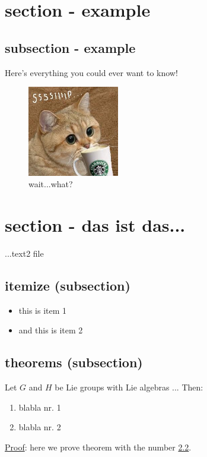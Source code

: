 
\section{section - example} 
		
\subsection{subsection - example}
Here's everything you could ever want to know!

\begin{figure}[h] %
\centering
\includegraphics[width=4cm]{./images/cat_sip.jpg}
\caption{wait...what?}
\end{figure}

\section{section - das ist das...}
...text2 file

\subsection{itemize (subsection)}

	\begin{itemize}
		\item this is item 1
		\item and this is item 2
	\end{itemize}
	
\subsection{theorems (subsection)}
		
	\label{mytheorem}
		Let $G$ and $H$ be Lie groups with Lie algebras ...
		Then:
		\begin{enumerate}
			\item blabla nr. 1
			\item blabla nr. 2
		\end{enumerate}

\underline{Proof}:
here we prove theorem with the number \ref{mytheorem}.

